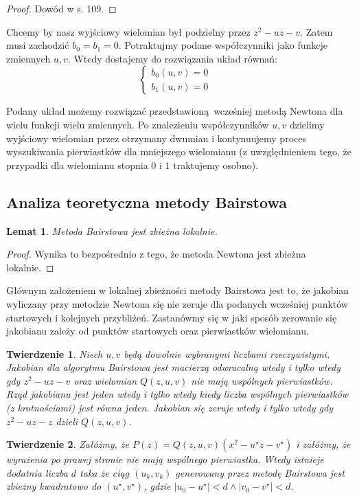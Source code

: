 \documentclass{article}
\newtheorem{thm}{Twierdzenie}
\newtheorem{lemat}{Lemat}
\begin{document}
\begin{proof}
Dowód w \cite{kincaid} s. 109.	
\end{proof}

Chcemy by nasz wyjściowy wielomian był podzielny przez $z^2 - uz - v$. Zatem musi zachodzić $b_0 = b_1 = 0$. Potraktujmy podane współczynniki jako funkcje zmiennych $u,v$. Wtedy dostajemy do rozwiązania układ równań:
$$
\left\{\begin{matrix}
b_0(u,v) = 0 & \\ 
b_1(u,v) = 0 & 
\end{matrix}\right.
$$

Podany układ możemy rozwiązać przedstawioną wcześniej metodą Newtona dla wielu funkcji wielu zmiennych. Po znalezieniu współczynników $u, v$ dzielimy wyjściowy wielomian przez otrzymany dwumian i kontynuujemy proces wyszukiwania pierwiastków dla mniejszego wielomianu (z uwzględnieniem tego, że przypadki dla wielomianu stopnia $0$ i $1$ traktujemy osobno).

\subsection{Analiza teoretyczna metody Bairstowa}

\begin{lemat}
Metoda Bairstowa jest zbieżna lokalnie.	
\end{lemat}

\begin{proof}
Wynika to bezpośrednio z tego, że metoda Newtona jest zbieżna lokalnie.	
\end{proof}

Głównym założeniem w lokalnej zbieżności metody Bairstowa jest to, że jakobian wyliczany przy metodzie Newtona się nie zeruje dla podanych wcześniej punktów startowych i kolejnych przybliżeń. Zastanówmy się w jaki sposób zerowanie się jakobianu zależy od punktów startowych oraz pierwiastków wielomianu.

\begin{thm}
Niech $u, v$ będą dowolnie wybranymi liczbami rzeczywistymi. Jakobian dla algorytmu Bairstowa jest macierzą odwracalną wtedy i tylko wtedy gdy $z^2 - uz - v$ oraz wielomian $Q(z,u,v)$ nie mają wspólnych pierwiastków. Rząd jakobianu jest jeden wtedy i tylko wtedy kiedy liczba wspólnych pierwiastków (z krotnościami) jest równa jeden. Jakobian się zeruje wtedy i tylko wtedy gdy $z^2 - uz - z$ dzieli $Q(z,u,v)$.
\end{thm}

\begin{thm}
Załóżmy, że $P(z) = Q(z, u, v) (x^2 - u^{\star} z - v^{\star})$ i załóżmy, że wyrażenia po prawej stronie nie mają wspólnego pierwiastka. Wtedy istnieje dodatnia liczba $d$ taka że ciąg $(u_k, v_k)$ generowany przez metodę Bairstowa jest zbieżny kwadratowo do $(u^{\star}, v^{\star})$, gdzie $|u_0 - u^{\star}| < d \wedge |v_0 - v^{\star}| < d$. 
\end{thm}
\end{document}
